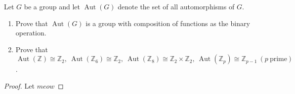 \documentclass[addpoints,10pt]{exam}
\theoremstyle{plain}
\theoremstyle{definition}
\newtheorem{prob}[thm]{Problem}
\theoremstyle{plain}
\theoremstyle{plain}
\theoremstyle{definition}
\let\oldprob\prob
\let\endoldprob\endprob
\renewenvironment{prob}
  {\begin{singlespace}\oldprob}
  {\endoldprob\end{singlespace}}
\begin{document}
\begin{prob}
  Let $G$ be a group and let $\operatorname{Aut}(G)$ denote the set of all automorphisms of $G$.
  \begin{enumerate}[label=(\alph*)]
  \item Prove that $\operatorname{Aut}(G)$ is a group with composition of functions as the binary operation.
  \item Prove that $\operatorname{Aut}(\mathbb{Z}) \cong \mathbb{Z}_2,\ 
  \operatorname{Aut}(\mathbb{Z}_6)\cong \mathbb{Z}_2,\
  \operatorname{Aut}(\mathbb{Z}_8)\cong \mathbb{Z}_2 \times \mathbb{Z}_2,\
  \operatorname{Aut}(\mathbb{Z}_p)\cong \mathbb{Z}_{p-1}\ (p\ \text{prime})$.
\end{enumerate}
\end{prob}

\begin{proof}Let $meow$
\end{proof}

\newpage
\setcounter{thm}{7}   %
\end{document}
